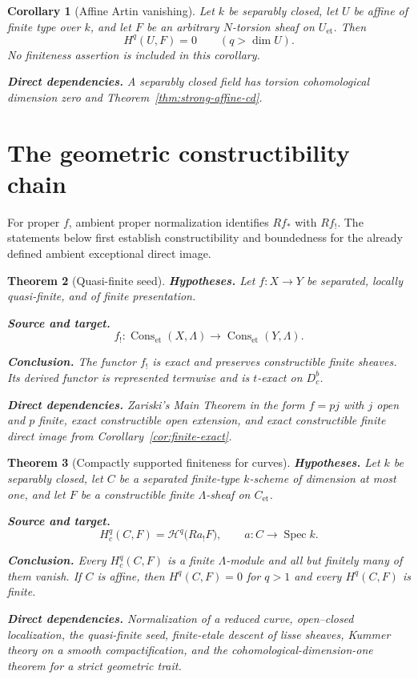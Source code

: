 \documentclass[10pt]{article}
\newtheorem{theorem}{Theorem}[section]
\newtheorem{corollary}[theorem]{Corollary}
\theoremstyle{definition}
\newcommand{\Dbc}{D^b_c}
\newcommand{\Spec}{\operatorname{Spec}}
\newcommand{\Cons}{\operatorname{Cons}}
\newcommand{\deps}[1]{\par\smallskip\noindent\textbf{Direct dependencies.} #1}
\begin{document}
\begin{corollary}[Affine Artin vanishing]
\label{thm:affine-artin}
Let $k$ be separably closed, let $U$ be affine of finite type over $k$, and
let $F$ be an arbitrary $N$-torsion sheaf on $U_{\mathrm{et}}$.  Then
\[
 H^q(U,F)=0\qquad(q>\dim U).
\]
No finiteness assertion is included in this corollary.
\deps{A separably closed field has torsion cohomological dimension zero and
Theorem~\ref{thm:strong-affine-cd}.}
\end{corollary}

\section{The geometric constructibility chain}

For proper $f$, ambient proper normalization identifies $Rf_*$ with $Rf_!$.
The statements below first establish constructibility and boundedness for
the already defined ambient exceptional direct image.

\begin{theorem}[Quasi-finite seed]
\label{thm:qf-seed}
\textbf{Hypotheses.} Let $f:X\to Y$ be separated, locally quasi-finite, and
of finite presentation.

\textbf{Source and target.}
\[
 f_!: \Cons_{\mathrm{et}}(X,\Lambda)\longrightarrow
       \Cons_{\mathrm{et}}(Y,\Lambda).
\]

\textbf{Conclusion.} The functor $f_!$ is exact and preserves constructible
finite sheaves.  Its derived functor is represented termwise and is
$t$-exact on $\Dbc$.
\deps{Zariski's Main Theorem in the form $f=pj$ with $j$ open and $p$ finite,
exact constructible open extension, and exact constructible finite direct
image from Corollary~\ref{cor:finite-exact}.}
\end{theorem}

\begin{theorem}[Compactly supported finiteness for curves]
\label{thm:curve-finite}
\textbf{Hypotheses.} Let $k$ be separably closed, let $C$ be a separated
finite-type $k$-scheme of dimension at most one, and let $F$ be a
constructible finite $\Lambda$-sheaf on $C_{\mathrm{et}}$.

\textbf{Source and target.}
\[
 H_c^q(C,F)=\mathcal H^q\bigl(Ra_!F\bigr),
 \qquad a:C\to\Spec k.
\]

\textbf{Conclusion.} Every $H_c^q(C,F)$ is a finite $\Lambda$-module and
all but finitely many of them vanish.  If $C$ is affine, then
$H^q(C,F)=0$ for $q>1$ and every $H^q(C,F)$ is finite.
\deps{Normalization of a reduced curve, open--closed localization, the
quasi-finite seed, finite-etale descent of lisse sheaves, Kummer theory on a
smooth compactification, and the cohomological-dimension-one theorem for a
strict geometric trait.}
\end{theorem}
\end{document}
